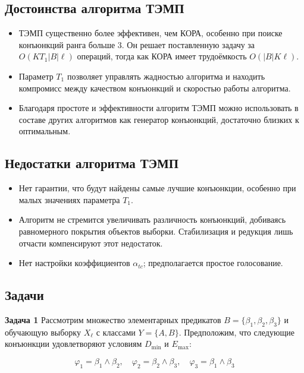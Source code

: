 \subsection{Достоинства алгоритма ТЭМП}

\begin{itemize}
    \item ТЭМП существенно более эффективен, чем КОРА, особенно при поиске конъюнкций ранга больше 3. Он решает поставленную задачу за $O(KT_1|B|\ell)$ операций, тогда как КОРА имеет трудоёмкость $O(|B|K\ell)$.
    \item Параметр $T_1$ позволяет управлять жадностью алгоритма и находить компромисс между качеством конъюнкций и скоростью работы алгоритма.
    \item Благодаря простоте и эффективности алгоритм ТЭМП можно использовать в составе других алгоритмов как генератор конъюнкций, достаточно близких к оптимальным.
\end{itemize}

\subsection{Недостатки алгоритма ТЭМП}

\begin{itemize}
    \item Нет гарантии, что будут найдены самые лучшие конъюнкции, особенно при малых значениях параметра $T_1$.
    \item Алгоритм не стремится увеличивать различность конъюнкций, добиваясь равномерного покрытия объектов выборки. Стабилизация и редукция лишь отчасти компенсируют этот недостаток.
    \item Нет настройки коэффициентов $\alpha_{tc}$; предполагается простое голосование.
          
\end{itemize}

\subsection{Задачи}

\textbf{Задача 1}
Рассмотрим множество элементарных предикатов \( B = \{ \beta_1, \beta_2, \beta_3 \} \) и обучающую выборку \( X_\ell \) с классами \( Y = \{A, B\} \). Предположим, что следующие конъюнкции удовлетворяют условиям \( D_{\text{min}} \) и \( E_{\text{max}} \):

\[
    \varphi_1 = \beta_1 \wedge \beta_2, \quad \varphi_2 = \beta_2 \wedge \beta_3, \quad \varphi_3 = \beta_1 \wedge \beta_3
\]

